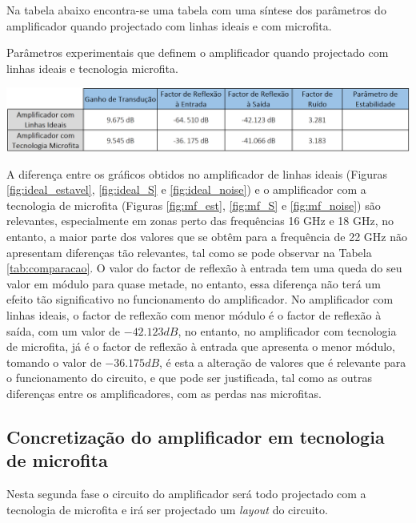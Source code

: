 \documentclass[11pt]{article}
\numberwithin{equation}{section}
\begin{document}
Na tabela abaixo encontra-se uma tabela com uma síntese dos parâmetros do amplificador quando projectado com linhas ideais e com microfita.

\begin{table}[H]
	\centering
	\caption{Parâmetros experimentais que definem o amplificador quando projectado com linhas ideais e tecnologia microfita.}
	\vspace{-1.5mm}
	\includegraphics[keepaspectratio=true, scale=0.45]{exps/comparacaoamp}
	\label{tab:comparacao}
\end{table}

A diferença entre os gráficos obtidos no amplificador de linhas ideais (Figuras \ref{fig:ideal_estavel}, \ref{fig:ideal_S} e \ref{fig:ideal_noise}) e o amplificador com a tecnologia de microfita (Figuras \ref{fig:mf_est}, \ref{fig:mf_S} e \ref{fig:mf_noise}) são relevantes, especialmente em zonas perto das frequências 16 GHz e 18 GHz, no entanto, a maior parte dos valores que se obtêm para a frequência de 22 GHz não apresentam diferenças tão relevantes, tal como se pode observar na Tabela \ref{tab:comparacao}. O valor do factor de reflexão à entrada tem uma queda do seu valor em módulo para quase metade, no entanto, essa diferença não terá um efeito tão significativo no funcionamento do amplificador. No amplificador com linhas ideais, o factor de reflexão com menor módulo é o factor de reflexão à saída, com um valor de $ -42.123 dB $, no entanto, no amplificador com tecnologia de microfita, já é o factor de reflexão à entrada que apresenta o menor módulo, tomando o valor de $ -36.175 dB $, é esta a alteração de valores que é relevante para o funcionamento do circuito, e que pode ser justificada, tal como as outras diferenças entre os amplificadores, com as perdas nas microfitas.


\subsection{Concretização do amplificador em tecnologia de microfita}

Nesta segunda fase o circuito do amplificador será todo projectado com a tecnologia de microfita e irá ser projectado um \textit{layout} do circuito.
\end{document}
